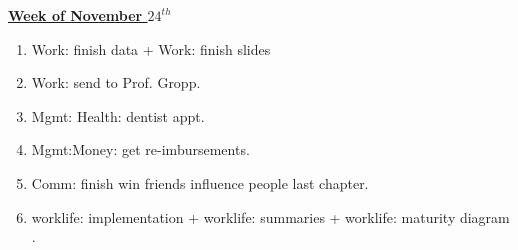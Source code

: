 \documentclass[11pt]{article}
\begin{document}
          {\small \underline{\textbf{Week of November $24^{th}$}} }
          \begin{enumerate}
            \tiny \item \tiny Work: finish data + Work: finish slides 
          \item \tiny Work: send to Prof. Gropp. 
          \item \tiny Mgmt: Health: dentist appt. 
          \item \tiny Mgmt:Money: get re-imbursements. 
          \item \tiny Comm: finish win friends influence people last chapter.   
          \item \tiny worklife: implementation  +  worklife: summaries  +  worklife: maturity diagram .
          \end{enumerate} 
\newpage 
\end{document}
